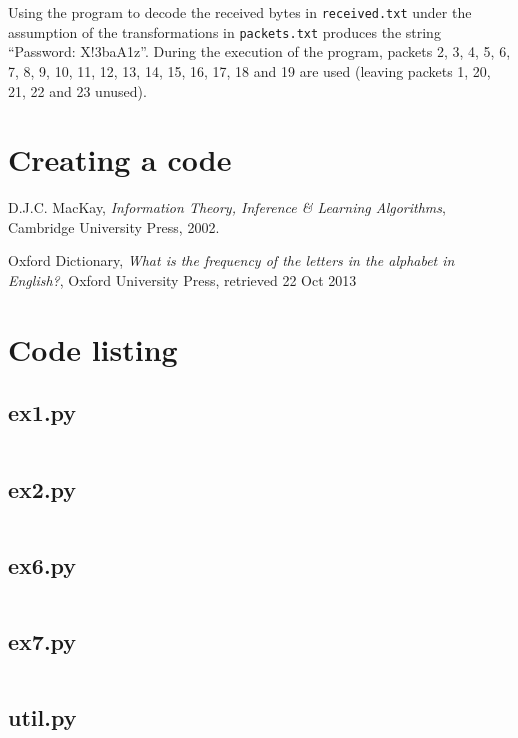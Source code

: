 \documentclass[10pt,a4paper,oneside,onecolumn]{article}
\newcommand*{\receivedTXT}{{\tt received.txt}\xspace}
\newcommand*{\packetsTXT}{{\tt packets.txt}\xspace}
\begin{document}
Using the program to decode the received bytes in \receivedTXT under the
assumption of the transformations in \packetsTXT produces the string ``Password:
X!3baA1z''. During the execution of the program, packets 2, 3, 4, 5, 6, 7, 8, 9,
10, 11, 12, 13, 14, 15, 16, 17, 18 and 19 are used (leaving packets 1, 20, 21,
22 and 23 unused).

\section{Creating a code}\label{sec:ex8}


\begin{thebibliography}{9}

    D.J.C. MacKay,
    \emph{Information Theory, Inference \& Learning Algorithms},
    Cambridge University Press,
    2002.

    Oxford Dictionary,
    \emph{What is the frequency of the letters in the alphabet in English?},
    Oxford University Press,
    retrieved 22 Oct 2013

\end{thebibliography}


\onecolumn
\appendixpage
\appendix

\section{Code listing}

\subsection{ex1.py}\label{app:ex1}
\inputminted{python}{../src/ex1.py}
\newpage

\subsection{ex2.py}\label{app:ex2}
\inputminted{python}{../src/ex2.py}
\newpage

\subsection{ex6.py}\label{app:ex6}
\inputminted{python}{../src/ex6.py}
\newpage

\subsection{ex7.py}\label{app:ex7}
\inputminted{python}{../src/ex7.py}
\newpage

\subsection{util.py}\label{app:util}
\inputminted{python}{../src/util.py}
\end{document}

